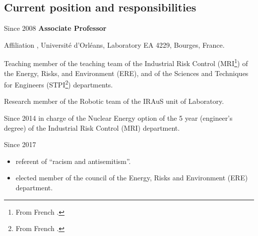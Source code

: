 \subsection{Current position and responsibilities}
\noindent
\begin{CV}
  \item[Since 2008] \textbf{Associate Professor} 
  \begin{CV}
    \item[Affiliation] \INSA \CVL, Université d'Orléans, \PRISMEshort Laboratory EA 4229, Bourges,    France.
    \item[Teaching]  member of the teaching team of the Industrial Risk Control  (MRI\footnote{From French .}) of the Energy, Risks, and Environment (ERE), and of the Sciences and Techniques for Engineers (STPI\footnote{From French .}) departments.
    \item[Research] member of the Robotic team of the IRAuS unit of \PRISMEshort Laboratory.
  \end{CV}

  \item[Since 2014]  in charge of the Nuclear Energy option of the 5 year (engineer's degree) of the Industrial Risk Control (MRI) department.
  
  \item[Since 2017] 
  \begin{itemize}
    \item referent of \enquote{racism and antisemitism}.
    \item elected  member of the council of the Energy, Risks and Environment (ERE) department.
  \end{itemize}
\end{CV}


